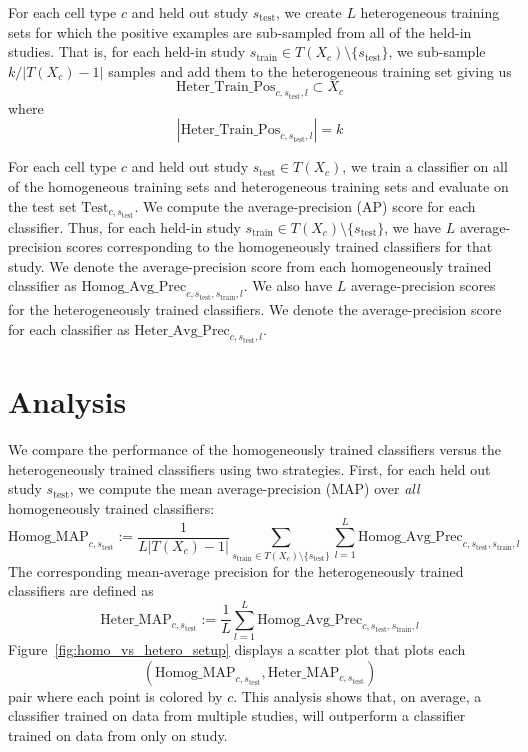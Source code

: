 For each cell type $c$ and held out study $s_{\text{test}}$, we create $L$ heterogeneous training sets for which the positive examples are sub-sampled from all of the held-in studies. That is, for each held-in study $s_{\text{train}} \in T(X_c) \setminus \{s_{\text{test}}\}$, we sub-sample $k / |T(X_c) - 1|$ samples and add them to the heterogeneous training set giving us 
$$\text{Heter\_Train\_Pos}_{c,s_{\text{test}},l} \subset X_c$$
where 
$$|\text{Heter\_Train\_Pos}_{c,s_{\text{test}},l}| = k$$

For each cell type $c$ and held out study $s_{\text{test}} \in T(X_c)$, we train a classifier on all of the homogeneous training sets and heterogeneous training sets and evaluate on the test set $\text{Test}_{c,s_{\text{test}}}$. We compute the average-precision (AP) score for each classifier.  Thus, for each held-in study $s_{\text{train}} \in T(X_c) \setminus \{s_{\text{test}}\}$, we have $L$ average-precision scores corresponding to the homogeneously trained classifiers for that study.
We denote the average-precision score from each homogeneously trained classifier as $\text{Homog\_Avg\_Prec}_{c,s_{\text{test}},s_{\text{train}},l}$.  We also have $L$ average-precision scores for the heterogeneously trained classifiers. We denote the average-precision score for each classifier as $\text{Heter\_Avg\_Prec}_{c,s_{\text{test}},l}$.

\section{Analysis }

We compare the performance of the homogeneously trained classifiers versus the heterogeneously trained classifiers using two strategies. First, for each held out study $s_{\text{test}}$, we compute the mean average-precision (MAP) over \textit{all} homogeneously trained classifiers:
$$\text{Homog\_MAP}_{c,s_{\text{test}}} := \frac{1}{L|T(X_c)-1|} \sum_{s_{\text{train}} \in T(X_c) \setminus \{s_{\text{test}}\}} \sum_{l=1}^L \text{Homog\_Avg\_Prec}_{c,s_{\text{test}},s_{\text{train}},l}$$
The corresponding mean-average precision for the heterogeneously trained classifiers are defined as
$$\text{Heter\_MAP}_{c,s_{\text{test}}} := \frac{1}{L} \sum_{l=1}^L \text{Homog\_Avg\_Prec}_{c,s_{\text{test}},s_{\text{train}},l}$$
Figure~\ref{fig:homo_vs_hetero_setup} displays a scatter plot that plots each 
$$(\text{Homog\_MAP}_{c,s_{\text{test}}}, \text{Heter\_MAP}_{c,s_{\text{test}}})$$ 
pair where each point is colored by $c$. This analysis shows that, on average, a classifier trained on data from multiple studies, will outperform a classifier trained on data from only on study.